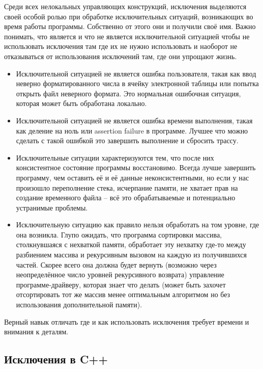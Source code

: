 \documentclass[a4paper,12pt,oneside]{article}
\begin{document}
Среди всех нелокальных управляющих конструкций, исключения выделяются своей особой ролью при обработке исключительных ситуаций, возникающих во время работы программы. Собственно от этого они и получили своё имя. Важно понимать, что является и что не является исключительной ситуацией чтобы не использовать исключения там где их не нужно использовать и наоборот не отказываться от использования исключений там, где они упрощают жизнь.

\begin{itemize}
\item
Исключительной ситуацией не является ошибка пользователя, такая как ввод неверно форматированного числа в ячейку электронной таблицы или попытка открыть файл неверного формата. Это нормальная ошибочная ситуация, которая может быть обработана локально.
\item
Исключительной ситуацией не является ошибка времени выполнения, такая как деление на ноль или assertion failure в программе. Лучшее что можно сделать с такой ошибкой это завершить выполнение и сбросить трассу.
\item
Исключительные ситуации характеризуются тем, что после них консистентное состояние программы восстановимо. Всегда лучше завершить программу, чем оставить её и её данные неконсистентными, но если у нас произошло переполнение стека, исчерпание памяти, не хватает прав на создание временного файла -- всё это обрабатываемые и потенциально устранимые проблемы.
\item
Исключительную ситуацию как правило нельзя обработать на том уровне, где она возникла. Глупо ожидать, что программа сортировки массива, столкнувшаяся с нехваткой памяти, обработает эту нехватку где-то между разбиением массива и рекурсивным вызовом на каждую из получившихся частей. Скорее всего она должна будет вернуть (возможно через неопределённое число уровней рекурсивного возврата) управление программе-драйверу, которая знает что делать (может быть захочет отсортировать тот же массив менее оптимальным алгоритмом но без использования дополнительной памяти).
\end{itemize}

Верный навык отличать где и как использовать исключения требует времени и внимания к деталям.

\pagebreak
\subsection{Исключения в C++}\label{CppExceptions}
\end{document}
